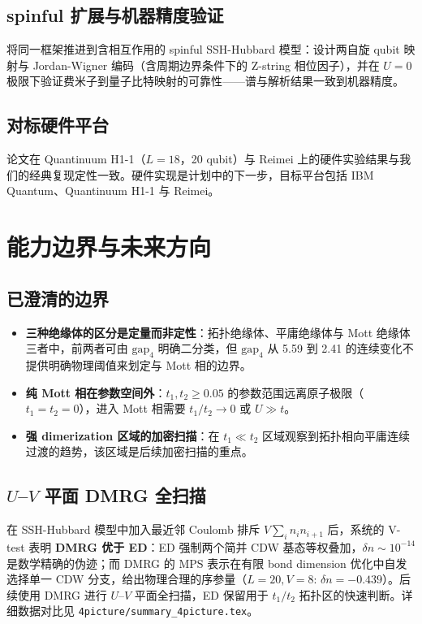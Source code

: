 \documentclass[11pt,a4paper]{article}
\begin{document}
\subsection{spinful 扩展与机器精度验证}

将同一框架推进到含相互作用的 spinful SSH-Hubbard 模型：设计两自旋 qubit 映射与 Jordan-Wigner 编码（含周期边界条件下的 Z-string 相位因子），并在 $U=0$ 极限下验证费米子到量子比特映射的可靠性——谱与解析结果一致到机器精度。

\subsection{对标硬件平台}

论文在 Quantinuum H1-1（$L=18$，20 qubit）与 Reimei 上的硬件实验结果与我们的经典复现定性一致。硬件实现是计划中的下一步，目标平台包括 IBM Quantum、Quantinuum H1-1 与 Reimei。

\section{能力边界与未来方向}

\subsection{已澄清的边界}

\begin{itemize}
  \item \textbf{三种绝缘体的区分是定量而非定性}：拓扑绝缘体、平庸绝缘体与 Mott 绝缘体三者中，前两者可由 $\mathrm{gap}_4$ 明确二分类，但 $\mathrm{gap}_4$ 从 5.59 到 2.41 的连续变化不提供明确物理阈值来划定与 Mott 相的边界。
  \item \textbf{纯 Mott 相在参数空间外}：$t_1,t_2\ge 0.05$ 的参数范围远离原子极限（$t_1=t_2=0$），进入 Mott 相需要 $t_1/t_2\to0$ 或 $U\gg t$。
  \item \textbf{强 dimerization 区域的加密扫描}：在 $t_1\ll t_2$ 区域观察到拓扑相向平庸连续过渡的趋势，该区域是后续加密扫描的重点。
\end{itemize}

\subsection{$U$--$V$ 平面 DMRG 全扫描}

在 SSH-Hubbard 模型中加入最近邻 Coulomb 排斥 $V\sum_i n_i n_{i+1}$ 后，系统的 V-test 表明 \textbf{DMRG 优于 ED}：ED 强制两个简并 CDW 基态等权叠加，$\delta n\sim 10^{-14}$ 是数学精确的伪迹；而 DMRG 的 MPS 表示在有限 bond dimension 优化中自发选择单一 CDW 分支，给出物理合理的序参量（$L=20, V=8$: $\delta n=-0.439$）。后续使用 DMRG 进行 $U$--$V$ 平面全扫描，ED 保留用于 $t_1/t_2$ 拓扑区的快速判断。详细数据对比见 \texttt{4picture/summary\_4picture.tex}。
\end{document}
